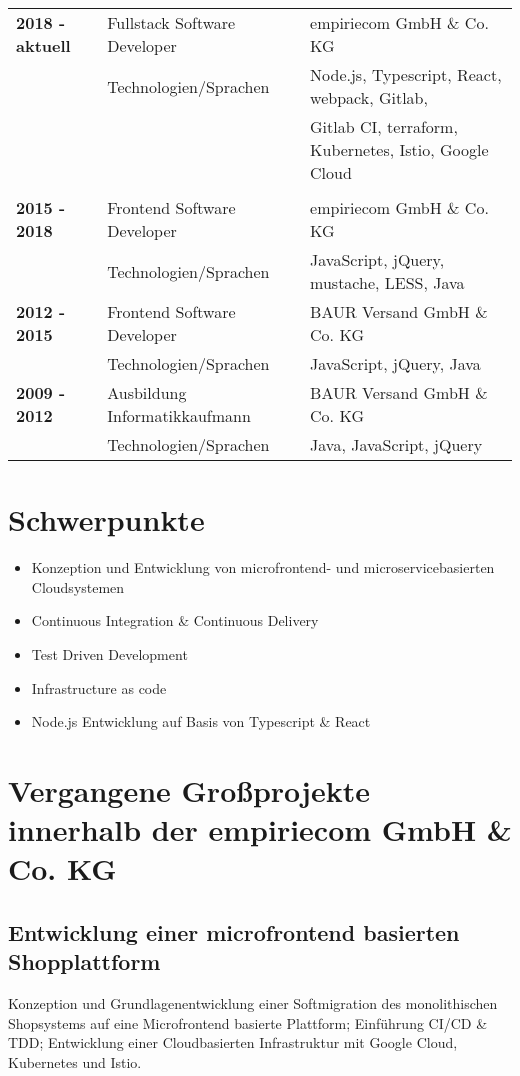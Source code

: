 \documentclass[10pt,ngerman,a4paper]{article}
\begin{document}
\begin{tabular}{lll}
\textbf{2018 - aktuell} & Fullstack Software Developer & empiriecom GmbH \& Co. KG \\
 & Technologien/Sprachen & Node.js, Typescript, React, webpack, Gitlab,\\
 & & Gitlab CI, terraform, Kubernetes, Istio, Google Cloud \\
\\
\textbf{2015 - 2018} & Frontend Software Developer & empiriecom GmbH \& Co. KG \\
 & Technologien/Sprachen & JavaScript, jQuery, mustache, LESS, Java \\
\textbf{2012 - 2015} & Frontend Software Developer & BAUR Versand GmbH \& Co. KG\\
 & Technologien/Sprachen & JavaScript, jQuery, Java \\
\textbf{2009 - 2012} & Ausbildung Informatikkaufmann & BAUR Versand GmbH \& Co. KG \\
 & Technologien/Sprachen & Java, JavaScript, jQuery \\
\end{tabular}

\section{Schwerpunkte}
\begin{itemize}
\item Konzeption und Entwicklung von microfrontend- und microservicebasierten Cloudsystemen
\item Continuous Integration \& Continuous Delivery
\item Test Driven Development
\item Infrastructure as code
\item Node.js Entwicklung auf Basis von Typescript \& React
\end{itemize}



\section{Vergangene Großprojekte innerhalb der empiriecom GmbH \& Co. KG}
\subsection{Entwicklung einer microfrontend basierten Shopplattform}
Konzeption und Grundlagenentwicklung einer Softmigration des monolithischen Shopsystems auf eine Microfrontend basierte Plattform; Einführung CI/CD \& TDD; Entwicklung einer Cloudbasierten Infrastruktur mit Google Cloud, Kubernetes und Istio.
\end{document}
